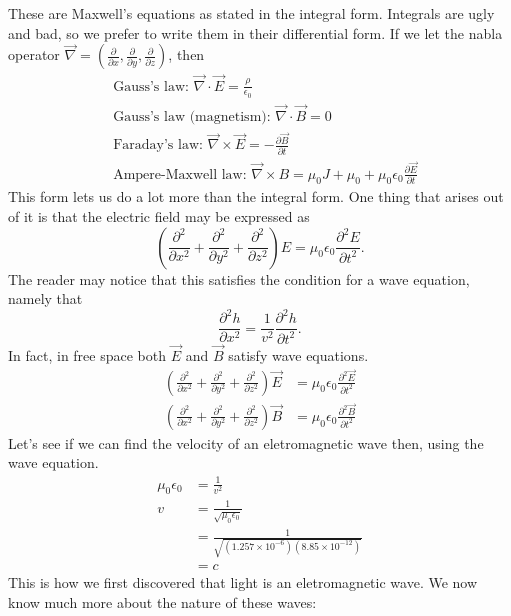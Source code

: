 \documentclass[nobib]{tufte-handout}
\begin{document}
These are Maxwell's equations as stated in the integral form. Integrals are ugly and bad, so 
we prefer to write them in their differential form. If we let the nabla operator 
$\vec{\nabla} = \left(\frac{\partial }{\partial x}, \frac{\partial}{\partial y}, \frac{\partial}{\partial z}\right)$, 
then 
\begin{align*}
    &\text{Gauss's law: } \vec{\nabla} \cdot \vec{E} = \frac{\rho}{\epsilon_0} \\
    &\text{Gauss's law (magnetism): } \vec{\nabla} \cdot \vec{B} = 0 \\
    &\text{Faraday's law: } \vec{\nabla} \times \vec{E} = -\frac{\partial \vec{B}}{\partial t} \\
    &\text{Ampere-Maxwell law: } \vec{\nabla} \times B = \mu_0 J + \mu_0 + \mu_0 \epsilon_0 \frac{\partial \vec{E}}{\partial t}
\end{align*}
This form lets us do a lot more than the integral 
form. One thing that arises out of it 
is that the electric field may be expressed as 
\[\left(\frac{\partial^2}{\partial x^2} + \frac{\partial^2}{\partial y^2} + \frac{\partial^2}{\partial z^2}\right)E = \mu_0 \epsilon_0 \frac{\partial^2 E}{\partial t^2}.\]
The reader may notice that this satisfies the 
condition for a wave equation, namely that 
\[\frac{\partial^2h}{\partial x^2} = \frac{1}{v^2} \frac{\partial^2h}{\partial t^2}.\]
In fact, in free space both $\vec{E}$ and $\vec{B}$ 
satisfy wave equations. 
\begin{align*}
    \left(\frac{\partial^2}{\partial x^2} + \frac{\partial^2}{\partial y^2} + \frac{\partial^2}{\partial z^2}\right)\vec{E} &= \mu_0 \epsilon_0 \frac{\partial^2 \vec{E}}{\partial t^2} \\
    \left(\frac{\partial^2}{\partial x^2} + \frac{\partial^2}{\partial y^2} + \frac{\partial^2}{\partial z^2}\right)\vec{B} &= \mu_0 \epsilon_0 \frac{\partial^2 \vec{B}}{\partial t^2}
\end{align*}
Let's see if we can find the velocity of an 
eletromagnetic wave then, using the wave equation. 
\begin{align*}
    \mu_0 \epsilon_0 &= \frac{1}{v^2} \\
    v &= \frac{1}{\sqrt{\mu_0 \epsilon_0}} \\
    &= \frac{1}{\sqrt{(1.257\times 10^{-6})(8.85\times 10^{-12})}} \\
    &= c
\end{align*}
This is how we first discovered that light is 
an eletromagnetic wave. We now know much 
more about the nature of these waves:
\end{document}
